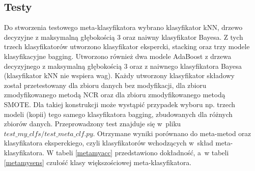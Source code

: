 \subsection{Testy}
Do stworzenia testowego meta-klasyfikatora wybrano klasyfikator kNN, drzewo decyzyjne z maksymalną głębokością 3 oraz naiwny klasyfikator Bayesa. Z tych trzech klasyfikatorów utworzono klasyfikator ekspercki, stacking oraz trzy modele klasyfikacyjne bagging. Utworzono również dwa modele AdaBoost z drzewa decyzyjnego z maksymalną głębokością 3 oraz z naiwnego klasyfikatora Bayesa (klasyfikator kNN nie wspiera wag). Każdy utworzony klasyfikator składowy został przetestowany dla zbioru danych bez modyfikacji, dla zbioru zmodyfikowanego metodą NCR oraz dla zbioru zmodyfikowanego metodą SMOTE. Dla takiej konstrukcji może wystąpić przypadek wyboru np. trzech modeli (kopii) tego samego klasyfikatora bagging, zbudowanych dla różnych zbiorów danych. Przeprowadzony test znajduje się w~pliku $test\_my\_clfs/test\_meta\_clf.py$. Otrzymane wyniki porównano do meta-metod oraz klasyfikatora eksperckiego, czyli klasyfikatorów wchodzących w~skład meta-klasyfikatora. W tabeli \ref{metamyacc} przedstawiono dokładność, a~w tabeli \ref{metamysens} czułość klasy większościowej meta-klasyfikatora.
